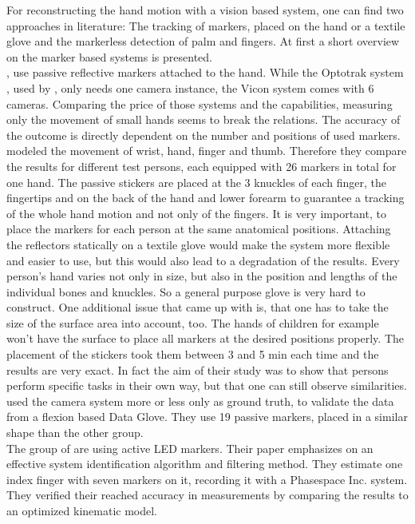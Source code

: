 For reconstructing the hand motion with a vision based system, one can find two approaches in literature: The tracking of markers, placed on the hand or a textile glove and the markerless detection of palm and fingers. At first a short overview on the marker based systems is presented. \\
\cite{supuk2008evaluation}, \cite{metcalf2008validation} use passive reflective markers attached to the hand. While the Optotrak system \cite{optotrak}, used by \cite{supuk2008evaluation}, only needs one camera instance, the Vicon system  comes with 6 cameras. Comparing the price  of those systems and the capabilities, measuring only the movement of small hands seems to break the relations. The accuracy of the outcome is directly dependent on the number and positions of used markers. \cite{metcalf2008validation} modeled the movement of wrist, hand, finger and thumb. Therefore they compare the results for different test persons, each equipped with 26 markers in total for one hand. The passive stickers are placed at the 3 knuckles of each finger, the fingertips and on the back of the hand and lower forearm to guarantee a tracking of the whole hand motion and not only of the fingers. It is very important, to place the markers for each person at the same anatomical positions. Attaching the reflectors statically on a textile glove would make the system more flexible and easier to use, but this would also lead to a degradation of the results. Every person's hand varies not only in size, but also in the position and lengths of the individual bones and knuckles. So a general purpose glove is very hard to construct. One additional issue that \cite{metcalf2008validation} came up with is, that one has to take the size of the surface area into account, too. The hands of children for example won't have the surface to place all markers at the desired positions properly. The placement of the stickers took them between 3 and 5 min each time and the results are very exact. In fact the aim of their study was to show that persons perform specific tasks in their own way, but that one can still observe similarities.
\cite{supuk2008evaluation} used the camera system more or less only as ground truth, to validate the data from a flexion based Data Glove. They use 19 passive markers, placed in a similar shape than the other group.\\
The group of \cite{yun2013accurate} are using active LED markers. Their paper emphasizes on an effective system identification algorithm and filtering method. They estimate one index finger with seven markers on it, recording it with a Phasespace Inc. system. They verified their reached accuracy in measurements by comparing the results to an optimized kinematic model.\\
